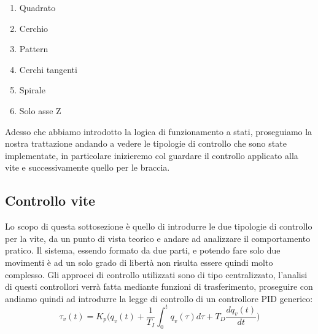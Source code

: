 \begin{enumerate}
	\item Quadrato
	\item Cerchio
	\item Pattern
	\item Cerchi tangenti
	\item Spirale
	\item Solo asse Z
\end{enumerate}
Adesso che abbiamo introdotto la logica di funzionamento a stati, proseguiamo la nostra trattazione andando a vedere le tipologie di controllo che sono state implementate, in particolare inizieremo col guardare il controllo applicato alla vite e successivamente quello per le braccia.
\subsection{Controllo vite}%
Lo scopo di questa sottosezione è quello di introdurre le due tipologie di controllo per la vite, da un punto di vista teorico e andare ad analizzare il comportamento pratico. Il sistema, essendo formato da due parti, e potendo fare solo due movimenti è ad un solo grado di libertà non risulta essere quindi molto complesso. Gli approcci di controllo utilizzati sono di tipo centralizzato, l'analisi di questi controllori verrà fatta mediante funzioni di trasferimento, proseguire con andiamo quindi ad introdurre la legge di controllo di un controllore PID generico:
\begin{equation}
\tau_v (t) = K_p \bigg(q_v(t) + \frac{1}{T_I} \int_0^t q_v(\tau) d\tau + T_D \frac{d q_v(t)}{dt}\bigg)
\label{eq:PID}
\end{equation}
